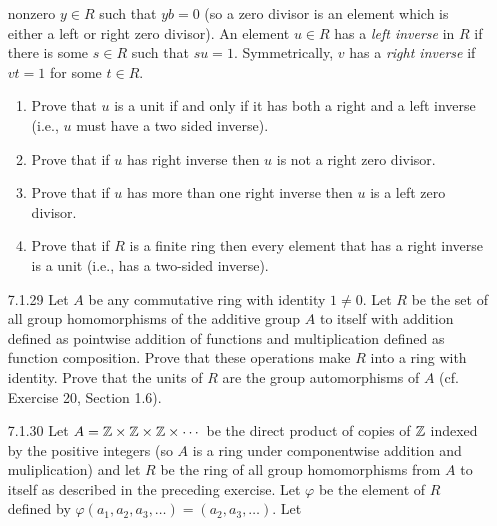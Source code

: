 \begin{enumerate}
                  nonzero $y \in R$ such that $yb = 0$ (so a zero divisor is an
                  element which is either a left or right zero divisor). An
                  element $u \in R$ has a \textit{left inverse} in $R$ if there
                  is some $s \in R$ such that $su = 1$. Symmetrically, $v$ has
                  a \textit{right inverse} if $vt = 1$ for some $t \in R$.
                  \begin{enumerate}
                     \item Prove that $u$ is a unit if and only if it has both a
                           right and a left inverse (i.e., $u$ must have a two
                           sided inverse).
                     \item Prove that if $u$ has right inverse then $u$ is not
                           a right zero divisor.
                     \item Prove that if $u$ has more than one right inverse
                           then $u$ is a left zero divisor.
                     \item Prove that if $R$ is a finite ring then every element
                           that has a right inverse is a unit (i.e., has a
                           two-sided inverse).
                  \end{enumerate}
   \item[7.1.29]  Let $A$ be any commutative ring with identity $1 \neq 0$. Let
                  $R$ be the set of all group homomorphisms of the additive
                  group $A$ to itself with addition defined as pointwise
                  addition of functions and multiplication defined as function
                  composition. Prove that these operations make $R$ into a ring
                  with identity. Prove that the units of $R$ are the group
                  automorphisms of $A$ (cf. Exercise 20, Section 1.6).
   \item[7.1.30]  Let $A = \mathbb{Z} \times \mathbb{Z} \times \mathbb{Z} \times \cdots$ be the direct
                  product of copies of $\mathbb{Z}$ indexed by the positive integers (so
                  $A$ is a ring under componentwise addition and muliplication)
                  and let $R$ be the ring of all group homomorphisms from $A$ to
                  itself as described in the preceding exercise. Let $\varphi$
                  be the element of $R$ defined by
                  $\varphi(a_1, a_2, a_3, \ldots) = (a_2, a_3, \ldots)$. Let

\end{enumerate}
